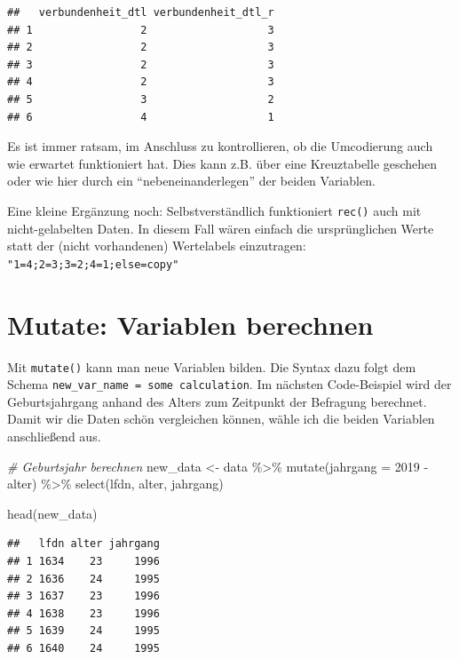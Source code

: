 \documentclass[
]{book}
\newenvironment{Shaded}{\begin{snugshade}}{\end{snugshade}}
\newcommand{\AttributeTok}[1]{\textcolor[rgb]{0.77,0.63,0.00}{#1}}
\newcommand{\CommentTok}[1]{\textcolor[rgb]{0.56,0.35,0.01}{\textit{#1}}}
\newcommand{\DecValTok}[1]{\textcolor[rgb]{0.00,0.00,0.81}{#1}}
\newcommand{\FunctionTok}[1]{\textcolor[rgb]{0.00,0.00,0.00}{#1}}
\newcommand{\NormalTok}[1]{#1}
\newcommand{\OtherTok}[1]{\textcolor[rgb]{0.56,0.35,0.01}{#1}}
\newcommand{\SpecialCharTok}[1]{\textcolor[rgb]{0.00,0.00,0.00}{#1}}
\begin{document}
\begin{verbatim}
##   verbundenheit_dtl verbundenheit_dtl_r
## 1                 2                   3
## 2                 2                   3
## 3                 2                   3
## 4                 2                   3
## 5                 3                   2
## 6                 4                   1
\end{verbatim}

Es ist immer ratsam, im Anschluss zu kontrollieren, ob die Umcodierung auch wie erwartet funktioniert hat. Dies kann z.B. über eine Kreuztabelle geschehen oder wie hier durch ein ``nebeneinanderlegen'' der beiden Variablen.

Eine kleine Ergänzung noch: Selbstverständlich funktioniert \texttt{rec()} auch mit nicht-gelabelten Daten. In diesem Fall wären einfach die ursprünglichen Werte statt der (nicht vorhandenen) Wertelabels einzutragen: \texttt{"1=4;2=3;3=2;4=1;else=copy"}

\hypertarget{mutate-variablen-berechnen}{%
\section{Mutate: Variablen berechnen}\label{mutate-variablen-berechnen}}

Mit \texttt{mutate()} kann man neue Variablen bilden. Die Syntax dazu folgt dem Schema \texttt{new\_var\_name\ =\ some\ calculation}. Im nächsten Code-Beispiel wird der Geburtsjahrgang anhand des Alters zum Zeitpunkt der Befragung berechnet. Damit wir die Daten schön vergleichen können, wähle ich die beiden Variablen anschließend aus.

\begin{Shaded}
\begin{Highlighting}[]
\CommentTok{\# Geburtsjahr berechnen}
\NormalTok{new\_data }\OtherTok{\textless{}{-}}\NormalTok{ data }\SpecialCharTok{\%\textgreater{}\%} 
  \FunctionTok{mutate}\NormalTok{(}\AttributeTok{jahrgang =} \DecValTok{2019} \SpecialCharTok{{-}}\NormalTok{ alter) }\SpecialCharTok{\%\textgreater{}\%} 
  \FunctionTok{select}\NormalTok{(lfdn, alter, jahrgang)}

\FunctionTok{head}\NormalTok{(new\_data)}
\end{Highlighting}
\end{Shaded}

\begin{verbatim}
##   lfdn alter jahrgang
## 1 1634    23     1996
## 2 1636    24     1995
## 3 1637    23     1996
## 4 1638    23     1996
## 5 1639    24     1995
## 6 1640    24     1995
\end{verbatim}
\end{document}
